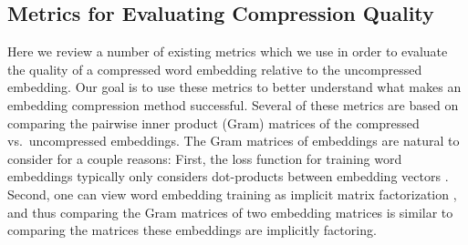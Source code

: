 



\subsection{Metrics for Evaluating Compression Quality}
\label{subsec:existing_metrics}
Here we review a number of existing metrics which we use in order to evaluate the quality of a compressed word embedding relative to the uncompressed embedding.
Our goal is to use these metrics to better understand what makes an embedding compression method successful.
Several of these metrics are based on comparing the pairwise inner product (Gram) matrices of the compressed vs.\ uncompressed embeddings.
The Gram matrices of embeddings are natural to consider for a couple reasons:
First, the loss function for training word embeddings typically only considers dot-products between embedding vectors \citep{word2vec13,glove14}.
Second, one can view word embedding training as implicit matrix factorization \citep{levy2014neural}, and thus comparing the Gram matrices of two embedding matrices is similar to comparing the matrices these embeddings are implicitly factoring.


